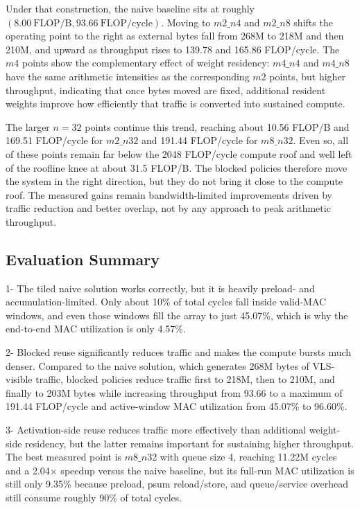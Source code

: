 Under that construction, the naive baseline sits at roughly $(8.00\ \text{FLOP/B}, 93.66\ \text{FLOP/cycle})$. Moving to $m2\_n4$ and $m2\_n8$ shifts the operating point to the right as external bytes fall from 268M to 218M and then 210M, and upward as throughput rises to 139.78 and 165.86 FLOP/cycle. The $m4$ points show the complementary effect of weight residency: $m4\_n4$ and $m4\_n8$ have the same arithmetic intensities as the corresponding $m2$ points, but higher throughput, indicating that once bytes moved are fixed, additional resident weights improve how efficiently that traffic is converted into sustained compute.

The larger $n=32$ points continue this trend, reaching about 10.56 FLOP/B and 169.51 FLOP/cycle for $m2\_n32$ and 191.44 FLOP/cycle for $m8\_n32$. Even so, all of these points remain far below the 2048 FLOP/cycle compute roof and well left of the roofline knee at about 31.5 FLOP/B. The blocked policies therefore move the system in the right direction, but they do not bring it close to the compute roof. The measured gains remain bandwidth-limited improvements driven by traffic reduction and better overlap, not by any approach to peak arithmetic throughput.

\subsection{Evaluation Summary}

1- The tiled naive solution works correctly, but it is heavily preload- and accumulation-limited. Only about 10\% of total cycles fall inside valid-MAC windows, and even those windows fill the array to just 45.07\%, which is why the end-to-end MAC utilization is only 4.57\%.

2- Blocked reuse significantly reduces traffic and makes the compute bursts much denser. Compared to the naive solution, which generates 268M bytes of VLS-visible traffic, blocked policies reduce traffic first to 218M, then to 210M, and finally to 203M bytes while increasing throughput from 93.66 to a maximum of 191.44 FLOP/cycle and active-window MAC utilization from 45.07\% to 96.60\%.

3- Activation-side reuse reduces traffic more effectively than additional weight-side residency, but the latter remains important for sustaining higher throughput. The best measured point is $m8\_n32$ with queue size 4, reaching 11.22M cycles and a 2.04$\times$ speedup versus the naive baseline, but its full-run MAC utilization is still only 9.35\% because preload, psum reload/store, and queue/service overhead still consume roughly 90\% of total cycles.